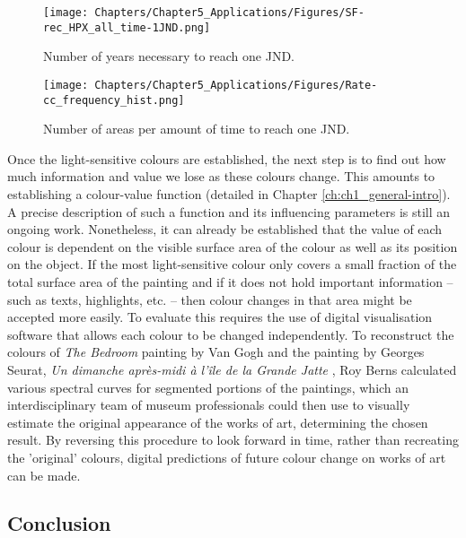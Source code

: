 \begin{figure*}[h!]
\centering
\texttt{[image: Chapters/Chapter5\_Applications/Figures/SF-rec\_HPX\_all\_time-1JND.png]}
\caption[\hspace{0.3cm}Number of years necessary to reach one \gls{JND}]{Number of years necessary to reach one \gls{JND}.}
\label{fig:SF_time-1JND}
\end{figure*}

\begin{figure*}[h!]
\centering
\texttt{[image: Chapters/Chapter5\_Applications/Figures/Rate-cc\_frequency\_hist.png]}
\caption[\hspace{0.3cm}Number of areas per amount of time to reach one JND]{Number of areas per amount of time to reach one JND.}
\label{fig:SF_frequency-JND}
\end{figure*}

Once the light-sensitive colours are established, the next step is to find out how much information and value we lose as these colours change. This amounts to establishing a colour-value function (detailed in Chapter \ref{ch:ch1_general-intro}). A precise description of such a function and its influencing parameters is still an ongoing work. Nonetheless, it can already be established that the value of each colour is dependent on the visible surface area of the colour as well as its position on the object. If the most light-sensitive colour only covers a small fraction of the total surface area of the painting and if it does not hold important information – such as texts, highlights, etc. – then colour changes in that area might be accepted more easily. To evaluate this requires the use of digital visualisation software that allows each colour to be changed independently. To reconstruct the colours of \textit{The Bedroom} painting by Van Gogh \citep{berns_digital_2019} and the painting by Georges Seurat, \textit{Un dimanche après-midi à l'île de la Grande Jatte} \citep{berns_rejuvenating_2006}, Roy Berns calculated various spectral curves for segmented portions of the paintings, which an interdisciplinary team of museum professionals could then use to visually estimate the original appearance of the works of art, determining the chosen result. By reversing this procedure to look forward in time, rather than recreating the ’original’ colours, digital predictions of future colour change on works of art can be made.\\




\subsection{Conclusion}


